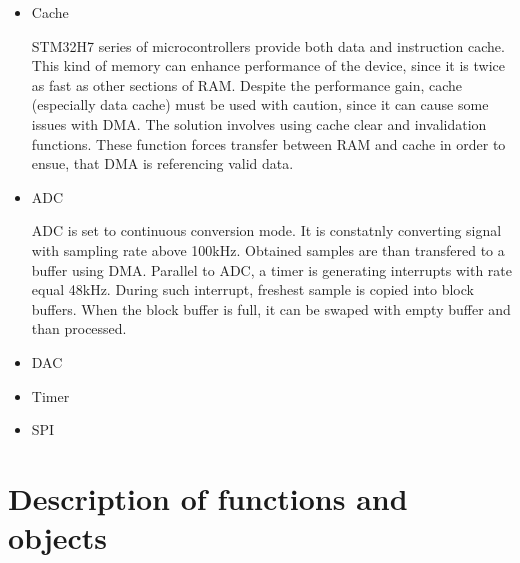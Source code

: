 \documentclass[a4paper,twoside,12pt]{book}
\begin{document}
\begin{itemize}
    \item Cache
    
    STM32H7 series of microcontrollers provide both data and instruction cache.
    This kind of memory can enhance performance of the device,
    since it is twice as fast as other sections of RAM.
    Despite the performance gain, cache (especially data cache)
    must be used with caution, since it can cause some issues with DMA.
    The solution involves using cache clear and invalidation functions.
    These function forces transfer between RAM and cache in order to ensue,
    that DMA is referencing valid data.

    \item ADC
    
    ADC is set to continuous conversion mode.
    It is constatnly converting signal with sampling rate above 100kHz.
    Obtained samples are than transfered to a buffer using DMA.
    Parallel to ADC, a timer is generating interrupts
    with rate equal 48kHz. During such interrupt,
    freshest sample is copied into block buffers. 
    When the block buffer is full, it can be swaped with empty buffer
    and than processed.

    \item DAC
    \item Timer
    \item SPI

\end{itemize}

\section{Description of functions and objects}
\end{document}
